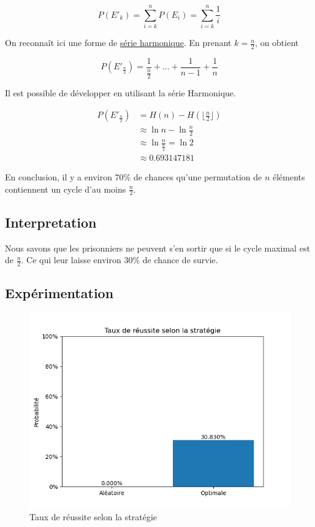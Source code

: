 	\begin{equation}
		P(E'_k) = \sum_{i = k}^{n} P(E_i) = \sum_{i = k}^{n} \frac{1}{i}
	\end{equation}

	On reconnaît ici une forme de \href{https://en.wikipedia.org/wiki/Harmonic_series_(mathematics)#}{série harmonique}.
	En prenant $k = \frac{n}{2}$, on obtient

	\begin{equation}
		P(E'_{\frac{n}{2}}) = \frac{1}{\frac{n}{2}} + \hdots + \frac{1}{n - 1} + \frac{1}{n}
	\end{equation}

	Il est possible de développer en utilisant la série Harmonique.

	\begin{align*}
		P(E'_{\frac{n}{2}}) & = H(n) - H(\lfloor \frac{n}{2} \rfloor)     \\
		                    & \approx \ln{n} - \ln{\frac{n}{2}}           \\
		                    & \approx \ln{\frac{n}{\frac{n}{2}}} = \ln{2} \\
		                    & \approx 0.693147181
	\end{align*}

	En conclusion, il y a environ 70\% de chances qu'une permutation de $n$ éléments contiennent un cycle d'au moins $\frac{n}{2}$.

\subsection{Interpretation}

	Nous savons que les prisonniers ne peuvent s'en sortir que si le cycle maximal est de $\frac{n}{2}$.
	Ce qui leur laisse environ 30\% de chance de survie.

\subsection{Expérimentation}

\begin{figure}[h]
  \includegraphics[width=\linewidth]{./strategies_succes.png}
  \caption{Taux de réussite selon la stratégie}
  \label{fig:strategies_success}
\end{figure}

